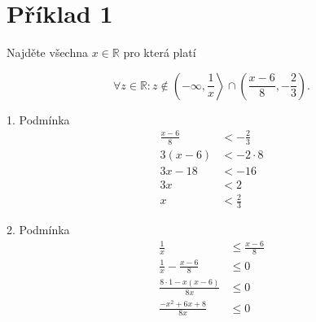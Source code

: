 \section*{Příklad 1}
Najděte všechna $ x \in \mathbb{R} $ pro která platí

$$
  \forall z \in \mathbb{R} \colon z \notin
  \left(
  -\infty,
  \frac{1}{x}
  \right\rangle
  \cap\left(
  \frac{x-6}{8},
  -\frac{2}{3}
  \right).
$$

1. Podmínka
\begin{equation*}
  \begin{aligned}
    \frac{x - 6}{8} & < -\frac{2}{3} \\
    3(x - 6)        & < -2\cdot8     \\
    3x - 18         & < -16          \\
    3x              & < 2            \\
    x               & < \frac{2}{3}
  \end{aligned}
\end{equation*}

2. Podmínka
\begin{equation*}
  \begin{aligned}
    \frac{1}{x}                      & \leq \frac{x - 6}{8} \\
    \frac{1}{x} - \frac{x - 6}{8}    & \leq 0               \\
    \frac{8 \cdot 1 - x (x - 6)}{8x} & \leq 0               \\
    \frac{-x^2 + 6x + 8}{8x}         & \leq 0
  \end{aligned}
\end{equation*}

